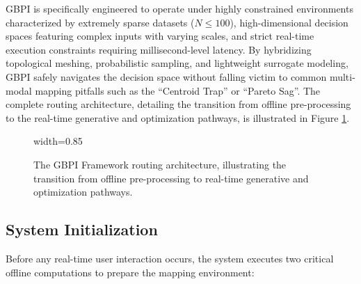 GBPI is specifically engineered to operate under highly constrained environments characterized by extremely sparse datasets ($N \le 100$), high-dimensional decision spaces featuring complex inputs with varying scales, and strict real-time execution constraints requiring millisecond-level latency. By hybridizing topological meshing, probabilistic sampling, and lightweight surrogate modeling, GBPI safely navigates the decision space without falling victim to common multi-modal mapping pitfalls such as the ``Centroid Trap'' or ``Pareto Sag''. The complete routing architecture, detailing the transition from offline pre-processing to the real-time generative and optimization pathways, is illustrated in Figure \ref{fig:gbpi_workflow}.

\begin{figure}[!htbp]
  \centering
  \begin{adjustbox}{width=0.85\linewidth}
      
  \end{adjustbox}
  \caption[GBPI Framework Routing Architecture]{The GBPI Framework routing architecture, illustrating the transition from offline pre-processing to real-time generative and optimization pathways.}
 \label{fig:gbpi_workflow}
\end{figure}

\subsection{System Initialization}
\label{subsec:gbpi_offline_phase}
Before any real-time user interaction occurs, the system executes two critical offline computations to prepare the mapping environment:

